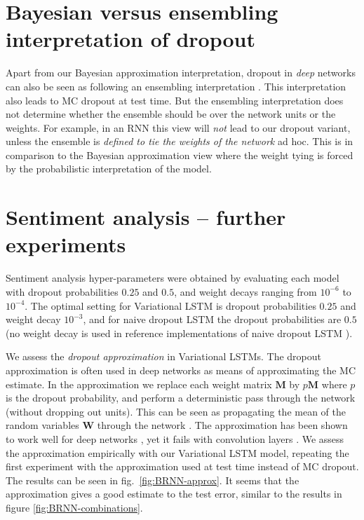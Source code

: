 \documentclass{article}
\newcommand{\W}{\mathbf{W}}
\newcommand{\M}{\mathbf{M}}
\theoremstyle{definition}
\begin{document}
{
\small
\setlength{\bibsep}{3pt plus 0.3ex}
\renewcommand{\baselinestretch}{0.98}


}
\renewcommand{\baselinestretch}{1}


\newpage
\appendix
\setlength{\belowcaptionskip}{-5pt}

\section{Bayesian versus ensembling interpretation of dropout}\label{sec:interp}

Apart from our Bayesian approximation interpretation, dropout in \textit{deep} networks can also be seen as following an ensembling interpretation \citep{srivastava2014dropout}. 
This interpretation also leads to MC dropout at test time.
But the ensembling interpretation does not determine whether the ensemble should be over the network units or the weights. 
For example, in an RNN this view will \textit{not} lead to our dropout variant, unless the ensemble is \textit{defined to tie the weights of the network} ad hoc.
This is in comparison to the Bayesian approximation view where the weight tying is forced by the probabilistic interpretation of the model.


\section{Sentiment analysis -- further experiments}\label{sec:exps}


Sentiment analysis hyper-parameters were obtained by evaluating each model with dropout probabilities $0.25$ and $0.5$, and weight decays ranging from $10^{-6}$ to $10^{-4}$.
The optimal setting for Variational LSTM is dropout probabilities $0.25$ and weight decay $10^{-3}$, and for naive dropout LSTM the dropout probabilities are $0.5$ (no weight decay is used in reference implementations of naive dropout LSTM \citep{zaremba2014recurrent}). 



We assess the \textit{dropout approximation} in Variational LSTMs. The dropout approximation is often used in deep networks as means of approximating the MC estimate. In the approximation we replace each weight matrix $\M$ by $p\M$ where $p$ is the dropout probability, and perform a deterministic pass through the network (without dropping out units). This can be seen as propagating the mean of the random variables $\W$ through the network \citep{Gal2015DropoutB}. The approximation has been shown to work well for deep networks \cite{srivastava2014dropout}, yet it fails with convolution layers \citep{Gal2015Bayesian}. We assess the approximation empirically with our Variational LSTM model, repeating the first experiment with the approximation used at test time instead of MC dropout. The results can be seen in fig.\ \ref{fig:BRNN-approx}. It seems that the approximation gives a good estimate to the test error, similar to the results in figure \ref{fig:BRNN-combinations}. 
\end{document}
